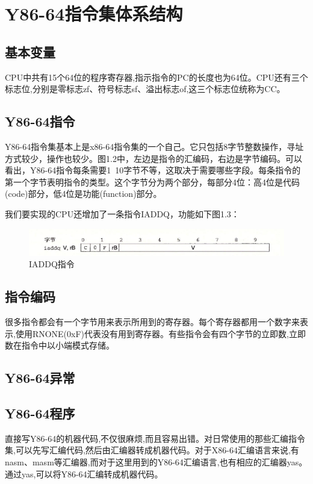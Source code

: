 \documentclass[a4paper,12pt]{report}
\begin{document}
\chapter{Y86-64指令集体系结构}
\setcounter{page}{1}
\begin{spacing}{1.5} %
\songti{}
\section{基本变量}
	CPU中共有15个64位的程序寄存器,指示指令的PC的长度也为64位。CPU还有三个标志位,分别是零标志zf、符号标志sf、溢出标志of,这三个标志位统称为CC。
	
\section{Y86-64指令}
	Y86-64指令集基本上是x86-64指令集的一个自己。它只包括8字节整数操作，寻址方式较少，操作也较少。图1.2中，左边是指令的汇编码，右边是字节编码。可以看出，Y86-64指令每条需要1~10字节不等，这取决于需要哪些字段。每条指令的第一个字节表明指令的类型。这个字节分为两个部分，每部分4位：高4位是代码(code)部分，低4位是功能(function)部分。
	
	我们要实现的CPU还增加了一条指令IADDQ，功能如下图1.3：
	
	\begin{figure}[htb] %
		\centering
		\includegraphics [width=1\textwidth]{figure/IADDQ.png}
		\caption{IADDQ指令}\label{Y86-64}
	\end{figure}

\section{指令编码}

	很多指令都会有一个字节用来表示所用到的寄存器。每个寄存器都用一个数字来表示,使用RNONE(0xF)代表没有用到寄存器。有些指令会有四个字节的立即数,立即数在指令中以小端模式存储。
	
\section{Y86-64异常}

\section{Y86-64程序}
	直接写Y86-64的机器代码,不仅很麻烦,而且容易出错。对日常使用的那些汇编指令集,可以先写汇编代码,然后由汇编器转成机器代码。对于X86-64汇编语言来说,有nasm、masm等汇编器,而对于这里用到的Y86-64汇编语言,也有相应的汇编器yas。通过yas,可以将Y86-64汇编转成机器代码。
	

\end{spacing}
\end{document}
